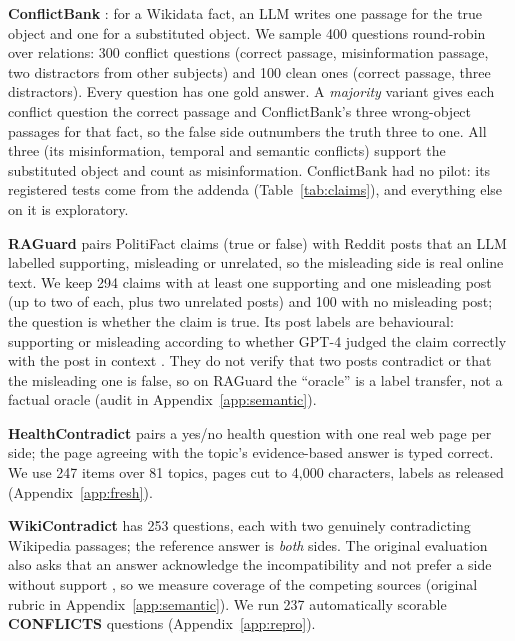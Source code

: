 \textbf{ConflictBank} \citep{su2024conflictbank}: for a Wikidata fact, an LLM writes one passage for the true
object and one for a substituted object. We sample 400 questions round-robin over relations: 300 conflict questions
(correct passage, misinformation passage, two distractors from other subjects) and 100 clean ones (correct passage,
three distractors). Every question has one gold answer. A
\emph{majority} variant gives each conflict question the correct passage and ConflictBank's three wrong-object
passages for that fact, so the false side outnumbers the truth three to one. All three (its misinformation, temporal
and semantic conflicts) support the substituted object and count as misinformation. ConflictBank had no pilot: its registered tests come from the addenda (Table~\ref{tab:claims}), and everything else on it is exploratory.

\textbf{RAGuard} \citep{zeng2025raguard} pairs PolitiFact claims (true or false) with Reddit posts that an LLM
labelled supporting, misleading or unrelated, so the misleading side is real online text. We keep 294 claims with at
least one supporting and one misleading post (up to two of each, plus two unrelated posts) and 100 with no
misleading post; the question is whether the claim is true. Its post labels are behavioural: supporting or misleading according to whether GPT-4 judged the claim correctly with the post in context \citep[\S3.3]{zeng2025raguard}. They do not verify that two posts contradict or that the misleading one is false, so on RAGuard the ``oracle'' is a label transfer, not a factual oracle (audit in Appendix~\ref{app:semantic}).

\textbf{HealthContradict} \citep{zhang2026healthcontradict} pairs a yes/no health question with one real web page per side; the page agreeing with the topic's evidence-based answer is typed correct. We use 247 items over 81 topics, pages cut to 4,000 characters, labels as released (Appendix~\ref{app:fresh}).

\textbf{WikiContradict} \citep{hou2024wikicontradict} has 253 questions, each with two genuinely contradicting
Wikipedia passages; the reference answer is \emph{both} sides. The original evaluation also asks that an answer acknowledge the incompatibility and not prefer a side without support \citep[\S3.4]{hou2024wikicontradict}, so we measure coverage of the competing sources (original rubric in Appendix~\ref{app:semantic}). We run 237 automatically scorable
\textbf{CONFLICTS} \citep{cattan2025conflicts} questions (Appendix~\ref{app:repro}).

